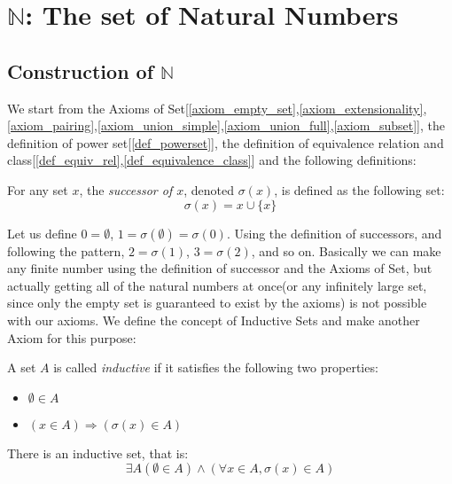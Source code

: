 \documentclass{report}
\begin{document}
	\section{$\mathbb{N}$: The set of Natural Numbers}
		\subsection{Construction of $\mathbb{N}$}
		We start from the Axioms of Set[\ref{axiom_empty_set},\ref{axiom_extensionality},\ref{axiom_pairing},\ref{axiom_union_simple},\ref{axiom_union_full},\ref{axiom_subset}], the definition of power set[\ref{def_powerset}], the definition of equivalence relation and class[\ref{def_equiv_rel},\ref{def_equivalence_class}] and the following definitions:
		
		\begin{defn}[Successor] \label{defn_successor}
			For any set $x$, the \emph{successor of $x$}, denoted $\sigma(x)$, is defined as the following set:
			\begin{displaymath}
			\sigma(x)=x \cup \{x\}
			\end{displaymath}
		\end{defn}
		
		Let us define $0=\emptyset$, $1=\sigma(\emptyset)=\sigma(0)$. Using the definition of successors, and following the pattern, $2=\sigma(1)$, $3=\sigma(2)$, and so on. Basically we can make any finite number using the definition of successor and the Axioms of Set, but actually getting all of the natural numbers at once(or any infinitely large set, since only the empty set is guaranteed to exist by the axioms) is not possible with our axioms. We define the concept of Inductive Sets and make another Axiom for this purpose:
		
		\begin{defn} \label{defn_inductive_set}
			A set $A$ is called \emph{inductive} if it satisfies the following two properties:
			\begin{itemize}
				\item $\emptyset \in A$
				\item $(x \in A) \Rightarrow (\sigma(x) \in A)$
			\end{itemize}
		\end{defn}
		
		\begin{axiom} \label{axiom_infinity}
			There is an inductive set, that is:
			\begin{displaymath}
			\exists A (\emptyset \in A) \wedge (\forall x \in A, \sigma(x) \in A)
			\end{displaymath}
		\end{axiom}
		
\end{document}
